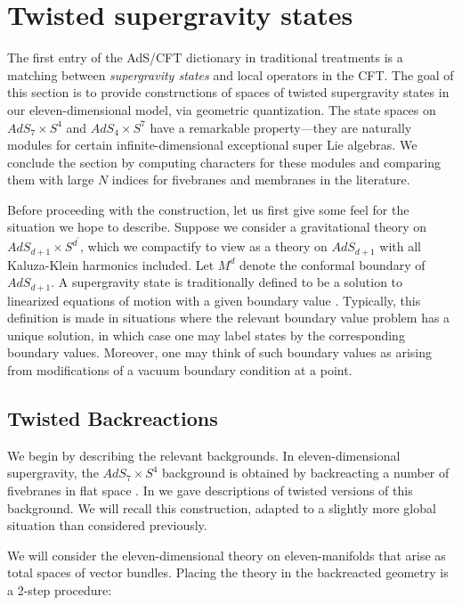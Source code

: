 %
%
%

\section{Twisted supergravity states}
\label{sec:states}

The first entry of the AdS/CFT dictionary in traditional treatments is a matching between \textit{supergravity states} and local operators in the CFT.
The goal of this section is to provide constructions of spaces of twisted supergravity states in our eleven-dimensional model, via geometric quantization. The state spaces on $AdS_{7}\times S^{4}$ and $AdS_{4}\times S^{7}$ have a remarkable property---they are naturally modules for certain infinite-dimensional exceptional super Lie algebras. We conclude the section by computing characters for these modules and comparing them with large $N$ indices for fivebranes and membranes in the literature.

Before proceeding with the construction, let us first give some feel for the situation we hope to describe. Suppose we consider a gravitational theory on $AdS_{d+1}\times S^{d^{\prime}}$, which we compactify to view as a theory on $AdS_{d+1}$ with all Kaluza-Klein harmonics included. Let $M^{d}$ denote the conformal boundary of $AdS_{d+1}$. A supergravity state is traditionally defined to be a solution to linearized equations of motion with a given boundary value \cite{}. Typically, this definition is made in situations where the relevant boundary value problem has a unique solution, in which case one may label states by the corresponding boundary values. Moreover, one may think of such boundary values as arising from modifications of a vacuum boundary condition at a point.


\subsection{Twisted Backreactions}
We begin by describing the relevant backgrounds. In eleven-dimensional supergravity, the $AdS_7 \times S^4$ background is obtained by backreacting a number of fivebranes in flat space \cite{Maldacena:1997re,WittenAdS}.
In \cite{RSW} we gave descriptions of twisted versions of this background. We will recall this construction, adapted to a slightly more global situation than considered previously.

We will consider the eleven-dimensional theory on eleven-manifolds that arise as total spaces of vector bundles. Placing the theory in the backreacted geometry is a 2-step procedure:

